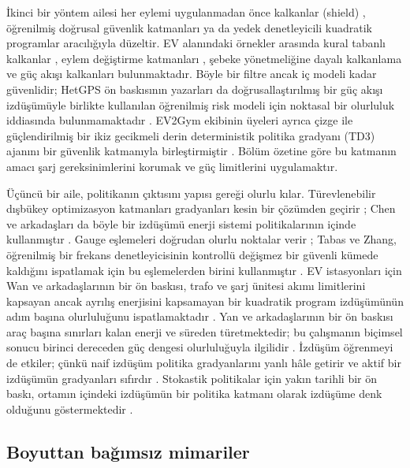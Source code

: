 İkinci bir yöntem ailesi her eylemi uygulanmadan önce kalkanlar (shield) \cite{alshiekh2018safe}, öğrenilmiş doğrusal güvenlik katmanları \cite{dalal2018safe} ya da yedek denetleyicili kuadratik programlar \cite{ceusters2023adaptive} aracılığıyla düzeltir.
EV alanındaki örnekler arasında kural tabanlı kalkanlar \cite{guan2024rule}, eylem değiştirme katmanları \cite{zhang2025dumes}, şebeke yönetmeliğine dayalı kalkanlama \cite{demirel2025multiobjective} ve güç akışı kalkanları \cite{zaman2026graph} bulunmaktadır.
Böyle bir filtre ancak iç modeli kadar güvenlidir; HetGPS ön baskısının yazarları da doğrusallaştırılmış bir güç akışı izdüşümüyle birlikte kullanılan öğrenilmiş risk modeli için noktasal bir olurluluk iddiasında bulunmamaktadır \cite{wang2026hetgps}.
EV2Gym ekibinin üyeleri ayrıca çizge ile güçlendirilmiş bir ikiz gecikmeli derin deterministik politika gradyanı (TD3) ajanını \cite{fujimoto2018addressing} bir güvenlik katmanıyla birleştirmiştir \cite{orfanoudakis2026can}.
Bölüm özetine göre bu katmanın amacı şarj gereksinimlerini korumak ve güç limitlerini uygulamaktır.

Üçüncü bir aile, politikanın çıktısını yapısı gereği olurlu kılar.
Türevlenebilir dışbükey optimizasyon katmanları gradyanları kesin bir çözümden geçirir \cite{amos2017optnet,agrawal2019differentiable}; Chen ve arkadaşları da böyle bir izdüşümü enerji sistemi politikalarının içinde kullanmıştır \cite{chen2021enforcing}.
Gauge eşlemeleri doğrudan olurlu noktalar verir \cite{li2023learning}; Tabas ve Zhang, öğrenilmiş bir frekans denetleyicisinin kontrollü değişmez bir güvenli kümede kaldığını ispatlamak için bu eşlemelerden birini kullanmıştır \cite{tabas2022computationally}.
EV istasyonları için Wan ve arkadaşlarının bir ön baskısı, trafo ve şarj ünitesi akımı limitlerini kapsayan ancak ayrılış enerjisini kapsamayan bir kuadratik program izdüşümünün adım başına olurluluğunu ispatlamaktadır \cite{wan2025logicinformed}.
Yan ve arkadaşlarının bir ön baskısı araç başına sınırları kalan enerji ve süreden türetmektedir; bu çalışmanın biçimsel sonucu birinci dereceden güç dengesi olurluluğuyla ilgilidir \cite{yan2026hierarchical}.
İzdüşüm öğrenmeyi de etkiler; çünkü naif izdüşüm politika gradyanlarını yanlı hâle getirir \cite{gros2020safe} ve aktif bir izdüşümün gradyanları sıfırdır \cite{kasaura2023benchmarking}.
Stokastik politikalar için yakın tarihli bir ön baskı, ortamın içindeki izdüşümün bir politika katmanı olarak izdüşüme denk olduğunu göstermektedir \cite{markgraf2025safe}.

\subsection{Boyuttan bağımsız mimariler}\label{sec:rw-scale}

